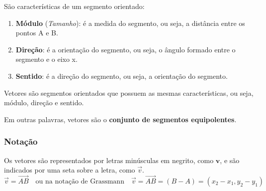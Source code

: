 \documentclass[12pt]{article}
\begin{document}
São características de um segmento orientado:
\begin{enumerate}
    \item \textbf{Módulo} (\textit{Tamanho}): é a medida do segmento, ou seja, a distância entre os pontos A e B.
    \item \textbf{Direção}: é a orientação do segmento, ou seja, o ângulo formado entre o segmento e o eixo x.
    \item \textbf{Sentido}: é a direção do segmento, ou seja, a orientação do segmento.
\end{enumerate}

Vetores são segmentos orientados que possuem as mesmas características, ou seja, módulo, direção e sentido.

Em outras palavras, vetores são o \textbf{conjunto de segmentos equipolentes}.

\subsubsection{Notação}
Os vetores são representados por letras minúsculas em negrito, como $\mathbf{v}$, e são indicados por uma seta sobre a letra, como $\overrightarrow{v}$.
\[
\overrightarrow{v} = \overrightarrow{AB} \quad \text{ou na notação de Grassmann} \quad \overrightarrow{v} = \overrightarrow{AB} = (B - A) = (x_2 - x_1, y_2 - y_1)
\]
\end{document}
